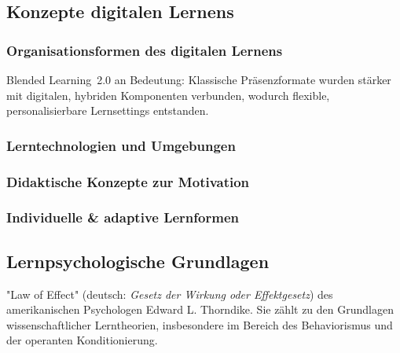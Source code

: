 \subsection{Konzepte digitalen Lernens}

\subsubsection{Organisationsformen des digitalen Lernens}




Blended Learning~2.0 an Bedeutung: Klassische Präsenzformate wurden stärker mit digitalen, hybriden Komponenten verbunden, wodurch flexible, personalisierbare Lernsettings entstanden.\parencite{bonk2020}


\subsubsection{Lerntechnologien und Umgebungen}




\subsubsection{Didaktische Konzepte zur Motivation}




\subsubsection{Individuelle \& adaptive Lernformen}





\subsection{Lernpsychologische Grundlagen}

"Law of Effect" (deutsch: \textit{Gesetz der Wirkung oder Effektgesetz}) des amerikanischen Psychologen Edward L. Thorndike. Sie zählt zu den Grundlagen wissenschaftlicher Lerntheorien, insbesondere im Bereich des Behaviorismus und der operanten Konditionierung.



